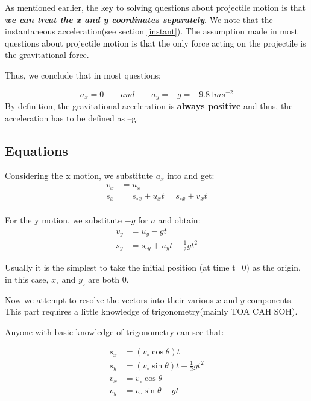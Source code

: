 As mentioned earlier, the key to solving questions about projectile motion is that \emph{\textbf{we can treat the x and y coordinates separately}}. We note that the instantaneous acceleration(see section \ref{instant}). The assumption made in most questions about projectile motion is that the only force acting on the projectile is the gravitational force.

Thus, we conclude that in most questions:
\begin{form}
$$a_x = 0 \qquad and \qquad a_y = -g = -9.81 ms^{-2}$$
By definition, the gravitational acceleration is \textbf{always positive} and thus, the acceleration has to be defined as --g.
\end{form}

\subsection{Equations}
\begin{form}[Equations for projectile motion, assuming that $a_x = 0 \quad and \quad a_y = -g$]
Considering the x motion, we substitute $a_x$ into and get:
\begin{equation*}
\begin{split}
v_x &= u_ x \\
s_x &= s_{\circ x} + u_x t = s_{\circ x} + v_x t\\ 
\end{split}
\end{equation*}

For the y motion, we substitute $-g$ for $a$ and obtain:
\begin{equation*}
\begin{split}
v_y &= u_y -gt\\
s_y &= s_{\circ y} + u_y t - \frac{1}{2}gt^2
\end{split}
\end{equation*}
\end{form}

Usually it is the simplest to take the initial position (at time t=0) as the origin, in this case, $x_\circ$ and $y_\circ$ are both 0.

Now we attempt to resolve the vectors into their various $x$ and $y$ components. This part requires a little knowledge of trigonometry(mainly TOA CAH SOH).

Anyone with basic knowledge of trigonometry can see that:
\begin{form}
\begin{equation*}
\begin{split}
s_x &= (v_\circ \cos \theta)t\\
s_y &= (v_\circ \sin \theta)t - \frac{1}{2}gt^2\\
v_x &= v_\circ \cos \theta\\
v_y &= v_\circ \sin \theta - gt
\end{split}
\end{equation*}
\end{form}

